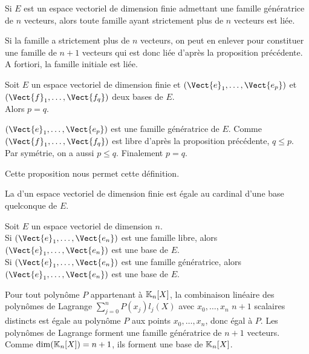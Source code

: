 \documentclass{book}
\begin{document}
\begin{Proposition}
Si $E$ est un espace vectoriel de dimension finie admettant une famille génératrice de $n$ vecteurs, alors toute famille ayant strictement plus de $n$ vecteurs est liée.
\end{Proposition}
\begin{Demonstration}
Si la famille a strictement plus de $n$ vecteurs, on peut en enlever pour constituer une famille de $n+1$ vecteurs qui est donc liée d'après la proposition précédente. A fortiori, la famille initiale est liée. 
\end{Demonstration}

\begin{Proposition}
Soit $E$ un espace vectoriel de dimension finie et $(\Vect{e}_1,\dots,\Vect{e_p})$ et $(\Vect{f}_1,\dots,\Vect{f_q})$ deux bases de $E$.\\
Alors $p=q$.
\end{Proposition}
\begin{Demonstration}
$(\Vect{e}_1,\dots,\Vect{e_p})$ est une famille génératrice de $E$. Comme $(\Vect{f}_1,\dots,\Vect{f_q})$ est libre d'après la proposition précédente,  $q\leq p$.
Par symétrie, on a aussi $p\leq q$. Finalement $p=q$.
\end{Demonstration}
Cette proposition nous permet cette définition.
\begin{DefinitionProposition}[Dimension]
La  d'un espace vectoriel de dimension finie est égale au cardinal d'une base quelconque de $E$.
\end{DefinitionProposition}

\begin{Proposition}[Critère]
Soit $E$ un espace vectoriel de dimension $n$.\\
Si $(\Vect{e}_1,\dots,\Vect{e_n})$ est une famille libre, alors $(\Vect{e}_1,\dots,\Vect{e_n})$ est une base de $E$.\\
Si $(\Vect{e}_1,\dots,\Vect{e_n})$ est une famille génératrice, alors $(\Vect{e}_1,\dots,\Vect{e_n})$ est une base de $E$.
\end{Proposition}
\begin{Exemple} Pour tout polynôme $P$ appartenant à $\mathbb{K} _{n}[X]$, la combinaison linéaire des polynômes de Lagrange  $\sum _{j=0}^{n}P(x_{j})l_{j}(X)$ avec $x_{0},\ldots ,x_{n}$ $n + 1$ scalaires distincts  est égale au polynôme $P$ aux points $x_{0},\ldots ,x_{n}$, donc égal à $P$. Les polynômes de Lagrange forment une famille génératrice de $n+1$ vecteurs. Comme $\dim(\mathbb{K} _{n}[X])=n+1$, ils forment une base de $\mathbb{K} _{n}[X]$. 
\end{Exemple}
\end{document}
